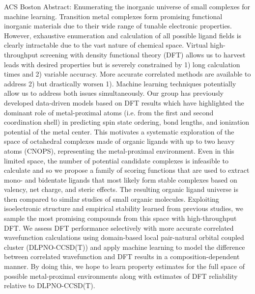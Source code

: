 ACS Boston Abstract: Enumerating the inorganic universe of small complexes for machine learning. Transition metal complexes form promising functional inorganic materials due to their wide range of tunable electronic properties. However, exhaustive enumeration and calculation of all possible ligand fields is clearly intractable due to the vast nature of chemical space. Virtual high-throughput screening with density functional theory (DFT) allows us to harvest leads with desired properties but is severely constrained by 1) long calculation times and 2) variable accuracy. More accurate correlated methods are available to address 2) but drastically worsen 1). Machine learning techniques potentially allow us to address both issues simultaneously. Our group has previously developed data-driven models based on DFT results which have highlighted the dominant role of metal-proximal atoms (i.e. from the first and second coordination shell) in predicting spin state ordering, bond lengths, and ionization potential of the metal center. This motivates a systematic exploration of the space of octahedral complexes made of organic ligands with up to two heavy atoms (CNOPS), representing the metal-proximal environment. Even in this limited space, the number of potential candidate complexes is infeasible to calculate and so we propose a family of scoring functions that are used to extract mono- and bidentate ligands that most likely form stable complexes based on valency, net charge, and steric effects. The resulting organic ligand universe is then compared to similar studies of small organic molecules. Exploiting isoelectronic structure and empirical stability learned from previous studies, we sample the most promising compounds from this space with high-throughput DFT. We assess DFT performance selectively with more accurate correlated wavefunction calculations using domain-based local pair-natural orbital coupled cluster (DLPNO-CCSD(T)) and apply machine learning to model the difference between correlated wavefunction and DFT results in a composition-dependent manner. By doing this, we hope to learn property estimates for the full space of possible metal-proximal environments along with estimates of DFT reliability relative to DLPNO-CCSD(T).